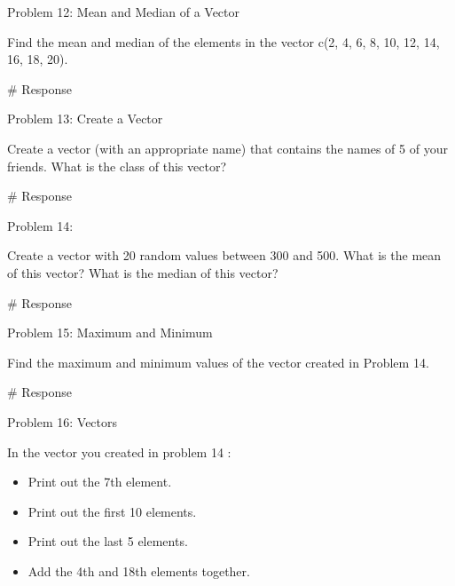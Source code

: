 \documentclass[
  letterpaper,
  DIV=11,
  numbers=noendperiod]{scrreprt}
\newenvironment{Shaded}{\begin{snugshade}}{\end{snugshade}}
\newcommand{\CommentTok}[1]{\textcolor[rgb]{0.37,0.37,0.37}{#1}}
\providecommand{\tightlist}{%
  \setlength{\itemsep}{0pt}\setlength{\parskip}{0pt}}\usepackage{longtable,booktabs,array}
\begin{document}
Problem 12: Mean and Median of a Vector

Find the mean and median of the elements in the vector c(2, 4, 6, 8, 10,
12, 14, 16, 18, 20).

\begin{Shaded}
\begin{Highlighting}[]
\CommentTok{\# Response}
\end{Highlighting}
\end{Shaded}

Problem 13: Create a Vector

Create a vector (with an appropriate name) that contains the names of 5
of your friends. What is the class of this vector?

\begin{Shaded}
\begin{Highlighting}[]
\CommentTok{\# Response}
\end{Highlighting}
\end{Shaded}

Problem 14:

Create a vector with 20 random values between 300 and 500. What is the
mean of this vector? What is the median of this vector?

\begin{Shaded}
\begin{Highlighting}[]
\CommentTok{\# Response}
\end{Highlighting}
\end{Shaded}

Problem 15: Maximum and Minimum

Find the maximum and minimum values of the vector created in Problem 14.

\begin{Shaded}
\begin{Highlighting}[]
\CommentTok{\# Response}
\end{Highlighting}
\end{Shaded}

Problem 16: Vectors

In the vector you created in problem 14 :

\begin{itemize}
\tightlist
\item
  Print out the 7th element.
\item
  Print out the first 10 elements.
\item
  Print out the last 5 elements.
\item
  Add the 4th and 18th elements together.
\end{itemize}
\end{document}
